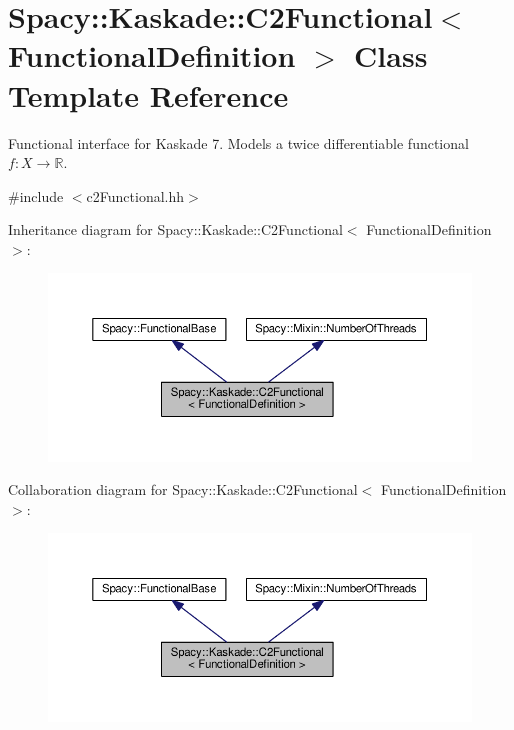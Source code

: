 \hypertarget{classSpacy_1_1Kaskade_1_1C2Functional}{}\section{Spacy\+:\+:Kaskade\+:\+:C2\+Functional$<$ Functional\+Definition $>$ Class Template Reference}
\label{classSpacy_1_1Kaskade_1_1C2Functional}


Functional interface for Kaskade 7. Models a twice differentiable functional $f:X\rightarrow \mathbb{R}$.  




{\ttfamily \#include $<$c2\+Functional.\+hh$>$}



Inheritance diagram for Spacy\+:\+:Kaskade\+:\+:C2\+Functional$<$ Functional\+Definition $>$\+:\nopagebreak
\begin{figure}[H]
\begin{center}
\leavevmode
\includegraphics[width=350pt]{classSpacy_1_1Kaskade_1_1C2Functional__inherit__graph}
\end{center}
\end{figure}


Collaboration diagram for Spacy\+:\+:Kaskade\+:\+:C2\+Functional$<$ Functional\+Definition $>$\+:\nopagebreak
\begin{figure}[H]
\begin{center}
\leavevmode
\includegraphics[width=350pt]{classSpacy_1_1Kaskade_1_1C2Functional__coll__graph}
\end{center}
\end{figure}

